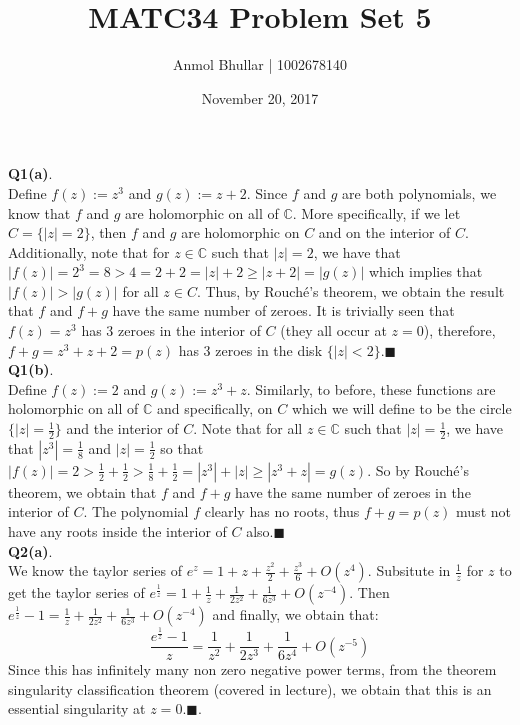 \documentclass{article}
\title{MATC34 Problem Set 5}
\date{November 20, 2017}
\author{Anmol Bhullar | 1002678140}
\begin{document}
    \maketitle 

    \textbf{Q1(a)}.\\
    Define $f(z) := z^3$ and $g(z) := z + 2$. Since $f$ and $g$ are both polynomials, we know that $f$ and $g$ are holomorphic on all
    of $\mathbb{C}$. More specifically, if we let $C = \{|z| = 2\}$, then $f$ and $g$ are holomorphic on $C$ and on the interior of
    $C$. Additionally, note that for $z\in\mathbb{C}$ such that $|z|=2$, we have that $|f(z)| = 2^3 = 8 > 4 = 2 + 2 = |z| + 2 \geq 
    |z+2| = |g(z)|$
    which implies that $|f(z)| > |g(z)|$ for all $z\in C$. Thus, by Rouché's theorem, we obtain the result that $f$ and $f+g$ have
    the same number of zeroes. It is trivially seen that $f(z)=z^3$ has 3 zeroes in the interior of $C$ (they all occur at $z=0$),
    therefore, $f+g = z^3+z+2 = p(z)$ has 3 zeroes in the disk $\{|z|<2\}$.\hfill$\blacksquare$\\

    \textbf{Q1(b)}.\\
    Define $f(z) := 2$ and $g(z) := z^3 + z$. Similarly, to before, these functions are holomorphic on all of $\mathbb{C}$ and
    specifically, on $C$ which we will define to be the circle $\{|z| = \frac{1}{2}\}$ and the interior of $C$. Note that
    for all $z\in\mathbb{C}$ such that $|z|=\frac{1}{2}$, we have that $|z^3|=\frac{1}{8}$ and $|z|=\frac{1}{2}$ so that 
    $|f(z)| = 2 > \frac{1}{2} + \frac{1}{2} > \frac{1}{8} + \frac{1}{2} = |z^3| + |z| \geq |z^3+z| = g(z)$. So by Rouché's
    theorem, we obtain that $f$ and $f+g$ have the same number of zeroes in the interior of $C$. The polynomial $f$ clearly has
    no roots, thus $f+g = p(z)$ must not have any roots inside the interior of $C$ also.\hfill$\blacksquare$\\

    \textbf{Q2(a)}.\\
    We know the taylor series of $e^z = 1 + z + \frac{z^2}{2} + \frac{z^3}{6} + O(z^4)$. 
    Subsitute in $\frac{1}{z}$ for $z$ to get the taylor series of  $e^{\frac{1}{z}} = 1 + \frac{1}{z} + \frac{1}{2z^2} 
    + \frac{1}{6z^3} + O(z^{-4})$. Then $e^{\frac{1}{z}}-1 = \frac{1}{z} + \frac{1}{2z^2} + \frac{1}{6z^3} + O(z^{-4})$ and
    finally, we obtain that:
    \[ \frac{e^{\frac{1}{z}}-1}{z} = \frac{1}{z^2} + \frac{1}{2z^3} + \frac{1}{6z^4} + O(z^{-5}) \]
    Since this has infinitely many non zero negative power terms, from the theorem singularity classification theorem (covered in
    lecture), we obtain that this is an essential singularity at $z=0$.\hfill$\blacksquare$.\\
\end{document}

